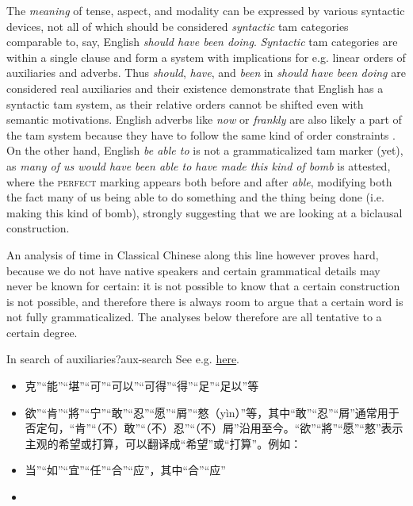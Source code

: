 \documentclass[UTF8, a4paper, oneside, scheme=plain, 12pt]{ctexrep}
\newcommand{\form}[1]{\emph{#1}}
\newcommand*{\category}[1]{\textsc{#1}}
\begin{document}
The \emph{meaning} of tense, aspect, and modality can be expressed by various syntactic devices,
not all of which should be considered \emph{syntactic} \ac{tam} categories comparable to, say, English \form{should have been doing}.
\emph{Syntactic} \ac{tam} categories are within a single clause
and form a system with implications for e.g. linear orders of auxiliaries and adverbs.
Thus \form{should}, \form{have}, and \form{been} in \form{should have been doing}
are considered real auxiliaries and their existence demonstrate that English has a syntactic \ac{tam} system,
as their relative orders cannot be shifted even with semantic motivations.
English adverbs like \form{now} or \form{frankly} are also likely a part of the \ac{tam} system
because they have to follow the same kind of order constraints \citep{cinque1999adverbs}.
On the other hand, English \form{be able to} is not a grammaticalized \ac{tam} marker (yet),
as \form{many of us would have been able to have made this kind of bomb} is attested,
where the \category{perfect} marking appears both before and after \form{able},
modifying both the fact many of us being able to do something
and the thing being done (i.e. making this kind of bomb),
strongly suggesting that we are looking at a biclausal construction.

An analysis of time in Classical Chinese along this line however proves hard,
because we do not have native speakers and certain grammatical details may never be known for certain:
it is not possible to know that a certain construction is not possible,
and therefore there is always room to argue that a certain word is not fully grammaticalized.
The analyses below therefore are all tentative to a certain degree.

\begin{todobox}{In search of auxiliaries?}{aux-search}
    See e.g. \href{http://www.ziyexing.com/files-5/guhanyu/guhanyu_3_1.htm}{here}.
    \begin{itemize}
        \item 克”“能”“堪”“可”“可以”“可得”“得”“足”“足以”等
        \item 欲”“肯”“將”“宁”“敢”“忍”“愿”“屑”“憗（yìn）”等，其中“敢”“忍”“屑”通常用于否定句，“肯”“（不）敢”“（不）忍”“（不）屑”沿用至今。“欲”“將”“愿”“憗”表示主观的希望或打算，可以翻译成“希望”或“打算”。例如：
        \item 当”“如”“宜”“任”“合”“应”，其中“合”“应”
        \item 
    \end{itemize}
\end{todobox}
\end{document}
